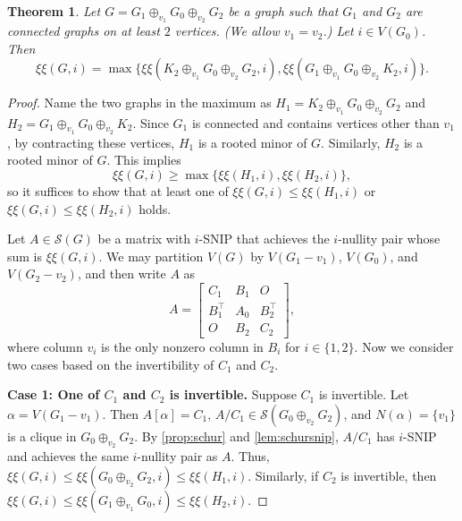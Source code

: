 \documentclass{article}
\newtheorem{theorem}{Theorem}[section]
\theoremstyle{definition}
\newcommand{\trans}{^\top}
\newcommand{\mptn}{\mathcal{S}} %
\newcommand{\excise}{\xi\xi}
\begin{document}
\begin{theorem}
Let $G = G_1\oplus_{v_1}G_0\oplus_{v_2}G_2$ be a graph such that $G_1$ and $G_2$ are connected graphs on at least $2$ vertices. (We allow $v_1 = v_2$.)
Let $i\in V(G_0)$.  Then 
\[
    \excise(G,i) = \max\{
    \excise(K_2\oplus_{v_1}G_0\oplus_{v_2}G_2, i), 
    \excise(G_1\oplus_{v_1}G_0\oplus_{v_2}K_2, i)
    \}.
\]
\end{theorem}
\begin{proof}
Name the two graphs in the maximum as $H_1 = K_2\oplus_{v_1}G_0\oplus_{v_2}G_2$ and $H_2 = G_1\oplus_{v_1}G_0\oplus_{v_2}K_2$.  Since $G_1$ is connected and contains vertices other than $v_1$, by contracting these vertices, $H_1$ is a rooted minor of $G$.  Similarly, $H_2$ is a rooted minor of $G$.  This implies
\[
    \excise(G,i) \geq \max\{
    \excise(H_1,i), \excise(H_2,i)
    \},
\]
so it suffices to show that at least one of $\excise(G,i) \leq \excise(H_1,i)$ or $\excise(G,i) \leq \excise(H_2,i)$ holds.

Let $A\in\mptn(G)$ be a matrix with $i$-SNIP that achieves the $i$-nullity pair whose sum is $\excise(G,i)$.  We may partition $V(G)$ by $V(G_1 - v_1)$, $V(G_0)$, and $V(G_2 - v_2)$, and then write $A$ as 
\[
    A = 
    \begin{bmatrix}
        C_1 & B_1 & O \\
        B_1\trans & A_0 & B_2\trans \\
        O & B_2 & C_2 
    \end{bmatrix},
\]
where column $v_i$ is the only nonzero column in $B_i$ for $i \in \{1,2\}$.  Now we consider two cases based on the invertibility of $C_1$ and $C_2$.  

{\bf Case 1: One of $C_1$ and $C_2$ is invertible.} Suppose $C_1$ is invertible.  Let $\alpha = V(G_1 - v_1)$.  Then $A[\alpha] = C_1$, $A/C_1\in\mptn(G_0\oplus_{v_2}G_2)$, and $N(\alpha) = \{v_1\}$ is a clique in $G_0\oplus_{v_2}G_2$. 
 By \cref{prop:schur} and \cref{lem:schursnip}, $A/C_1$ has $i$-SNIP and achieves the same $i$-nullity pair as $A$.  Thus, $\excise(G,i) \leq \excise(G_0\oplus_{v_2}G_2, i) \leq \excise(H_1,i)$.  Similarly, if $C_2$ is invertible, then $\excise(G,i) \leq \excise(G_1\oplus_{v_1}G_0, i) \leq \excise(H_2,i)$.


\end{proof}
\end{document}
